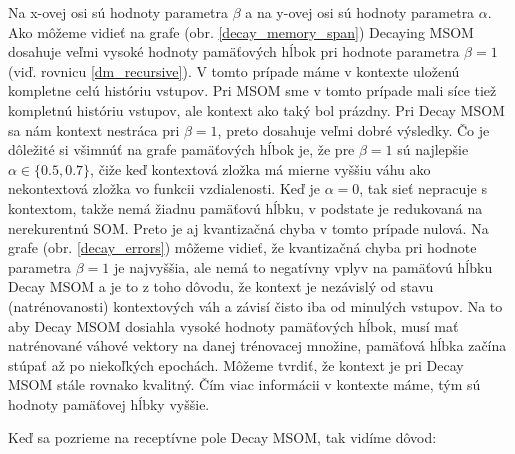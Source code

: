     
Na x-ovej osi sú hodnoty parametra $\beta$ a na y-ovej osi sú hodnoty parametra $\alpha$.
Ako môžeme vidieť na grafe (obr. \ref{decay_memory_span}) Decaying MSOM dosahuje veľmi vysoké hodnoty pamäťových hĺbok pri hodnote 
parametra $\beta = 1$ (viď. rovnicu \ref{dm_recursive}). V tomto prípade máme v kontexte uloženú kompletne celú históriu vstupov. Pri MSOM sme v tomto prípade mali síce tiež kompletnú históriu vstupov, ale kontext ako taký bol prázdny.
Pri Decay MSOM sa nám kontext nestráca pri $\beta = 1$, preto dosahuje veľmi dobré výsledky.
Čo je dôležité si všimnúť na grafe pamäťových hĺbok je, že pre $\beta = 1$ sú najlepšie $\alpha \in \lbrace 0.5, 0.7 \rbrace$, čiže keď kontextová zložka má mierne vyššiu váhu ako nekontextová zložka vo funkcii vzdialenosti. 
Keď je $\alpha = 0$, tak sieť nepracuje s kontextom, takže nemá žiadnu pamäťovú hĺbku,
v podstate je redukovaná na nerekurentnú SOM. Preto je aj kvantizačná chyba v tomto prípade nulová.
Na grafe (obr. \ref{decay_errors}) môžeme vidieť, že kvantizačná chyba pri hodnote parametra $\beta = 1$ je najvyššia, ale nemá to negatívny 
vplyv na pamäťovú hĺbku Decay MSOM a je to z toho dôvodu, že kontext je nezávislý od stavu (natrénovanosti) kontextových váh a závisí čisto iba od minulých vstupov.
Na to aby Decay MSOM dosiahla vysoké hodnoty pamäťových hĺbok, musí mať natrénované váhové vektory na danej trénovacej množine, pamäťová hĺbka začína stúpať až
po niekoľkých epochách.
Môžeme tvrdiť, že kontext je pri Decay MSOM stále rovnako kvalitný. Čím viac informácii v kontexte máme, tým sú hodnoty pamäťovej hĺbky vyššie.

Keď sa pozrieme na receptívne pole Decay MSOM, tak vidíme dôvod:

